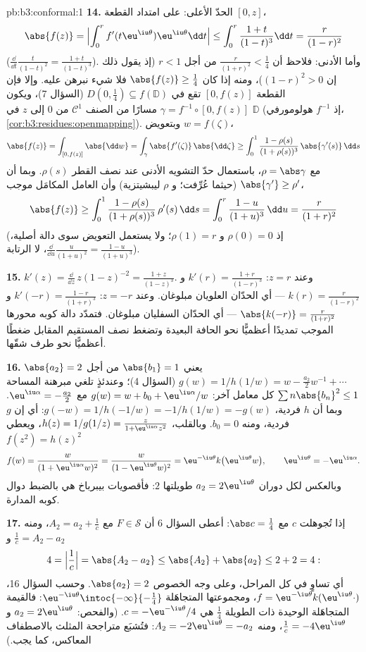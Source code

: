 \begin{solution}{pb:b3:conformal:1}
\textbf{14.} الحدّ الأعلى: على امتداد القطعة $[0, z]$،
\[
\abs{f(z)} = \Bigl|\int_0^rf'(t\eu^{\iu\theta})
\eu^{\iu\theta}\dd t\Bigr|
\leq \int_0^r\frac{1+t}{(1-t)^3}\dd t
= \frac{r}{(1-r)^2}
\]
($\frac{\dd}{\dd t}\frac t{(1-t)^2} = \frac{1+t}{(1-t)^3}$). وأما الأدنى: فلاحظ أن $\frac r{(1+r)^2} < \frac14$ من أجل $r < 1$ (إذ
يقول ذلك إن $(1-r)^2 > 0$)، ومنه إذا كان $\abs{f(z)} \geq \frac14$ فلا شيء نبرهن
عليه. وإلا فإن القطعة $[0, f(z)]$ تقع في $D(0, \frac14) \subseteq f(\mathbb D)$ (السؤال 7)،
ويكون $\gamma = f^{-1}\circ[0, f(z)]$ مسارًا من الصنف $\mathcal C^1$ من $0$ إلى $z$ في
$\mathbb D$ (إذ $f^{-1}$ هولومورفي، \cref{cor:b3:residues:openmapping}). وبتعويض
$w =
f(\zeta)$،
\[
\abs{f(z)} = \int_{[0,f(z)]}\abs{\dd w}
= \int_\gamma\abs{f'(\zeta)}\,\abs{\dd\zeta}
\geq \int_0^1\frac{1 - \rho(s)}{(1 + \rho(s))^3}
\,\abs{\gamma'(s)}\,\dd s
\]
مع $\rho = \abs\gamma$، باستعمال حدّ التشويه الأدنى عند نصف القطر
$\rho(s)$. وبما أن $\abs{\gamma'} \geq \rho'$ (حيثما عُرِّفت؛ و $\rho$ ليبشيتزية)
وأن العامل المكامَل موجب،
\[
\abs{f(z)} \geq \int_0^1
\frac{1 - \rho(s)}{(1 + \rho(s))^3}\,\rho'(s)\,\dd s
= \int_0^{r}\frac{1 - u}{(1 + u)^3}\,\dd u
= \frac{r}{(1 + r)^2}
\]
(إذ $\rho(0) = 0$ و $\rho(1) = r$؛ ولا يستعمل التعويض سوى دالة
أصلية، $\frac{\dd}{\dd u}\frac u{(1+u)^2} =
\frac{1-u}{(1+u)^3}$، لا الرتابة).

\textbf{15.} $k'(z) = \frac{\dd}{\dd z}\,z(1 - z)^{-2} =
\frac{1 + z}{(1 - z)^3}$. وعند $z = r$: $k'(r) =
\frac{1+r}{(1-r)^3}$ و $k(r) = \frac r{(1-r)^2}$ --- أي
الحدّان العلويان مبلوغان. وعند $z = -r$: $k'(-r) =
\frac{1-r}{(1+r)^3}$ و $\abs{k(-r)} = \frac r{(1+r)^2}$ ---
أي الحدّان السفليان مبلوغان. فتمدّد دالة كوبه محورها الموجب
تمديدًا أعظميًّا نحو الحافة البعيدة وتضغط نصف المستقيم المقابل
ضغطًا أعظميًّا نحو طرف شقّها.

\textbf{16.} $\abs{a_2} = 2$ يعني $\abs{b_1} = 1$ من أجل
$g(w)
= 1/h(1/w) = w - \frac{a_2}2w^{-1} + \cdots$ (السؤال 4)؛ وعندئذٍ تلغي مبرهنة المساحة $\sum n\abs{b_n}^2 \leq 1$ كل
معامل آخر: $g(w) = w + b_0 + \eu^{\iu\alpha}/w$ مع $\eu^{\iu\alpha} = -\frac{a_2}2$. وبما أن $h$ فردية، $g(-w) =
1/h(-1/w) = -1/h(1/w) = -g(w)$: أي
إن $g$ فردية، ومنه $b_0 = 0$. وبالقلب، $h(z) = 1/g(1/z) = \frac{z}{1 +
\eu^{\iu\alpha}z^2}$، ويعطي $f(z^2) = h(z)^2$
\[
f(w) = \frac{w}{(1 + \eu^{\iu\alpha}w)^2}
= \frac{w}{(1 - \eu^{\iu\theta}w)^2}
= \eu^{-\iu\theta}k\bigl(\eu^{\iu\theta}w\bigr),
\qquad \eu^{\iu\theta} = -\eu^{\iu\alpha} .
\]
وبالعكس لكل دوران $a_2 = 2\eu^{\iu\theta}$ طويلتها $2$: فأقصويات بيبرباخ هي
بالضبط دوال كوبه المدارة.

\textbf{17.} إذا تُجوهلت $c$ مع $\abs c = \frac14$: أعطى السؤال 6 أن
$F \in \mathcal S$ مع $A_2 = a_2 +
\frac1c$، ومنه $\frac1c = A_2 - a_2$ و
\[
4 = \Bigl|\frac1c\Bigr| = \abs{A_2 - a_2}
\leq \abs{A_2} + \abs{a_2} \leq 2 + 2 = 4 :
\]
أي تساوٍ في كل المراحل، وعلى وجه الخصوص $\abs{a_2} = 2$. وحسب
السؤال 16، $f = \eu^{-\iu\theta}k(\eu^{\iu\theta}\cdot)$، ومجموعتها المتجاهَلة $\eu^{-\iu\theta}
\intoc{-\infty}{-\frac14}$: فالقيمة
المتجاهَلة الوحيدة ذات الطويلة $\frac14$ هي $c = -\eu^{-\iu\theta}/4$. (والفحص:
$a_2 = 2\eu^{\iu\theta}$ و $\frac1c = -4\eu^{\iu\theta}$، ومنه $A_2 = -2\eu^{\iu\theta} = -a_2$: فتُشبَع متراجحة المثلث
بالاصطفاف المعاكس، كما يجب.)


\end{solution}
